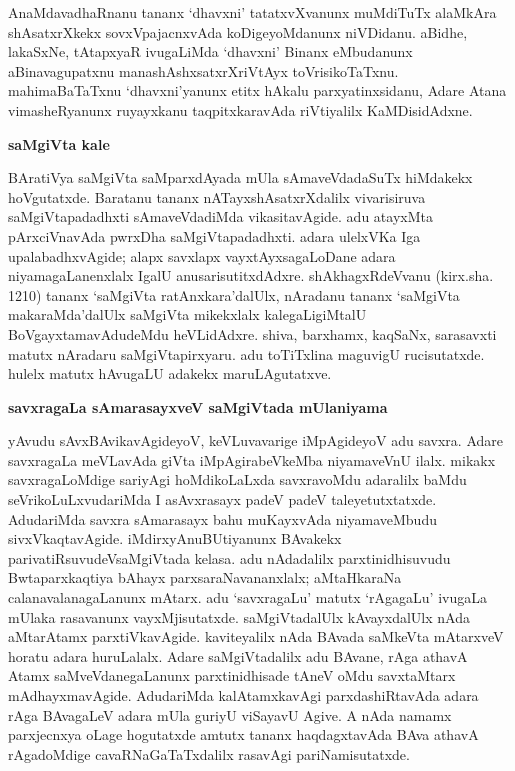 AnaMdavadhaRnanu tananx `dhavxni' tatatxvXvanunx muMdiTuTx alaMkAra shAsatxrXkekx sovxVpajacnx\-vAda koDigeyoMdanunx niVDidanu. aBidhe, lakaSxNe, tAtapxyaR ivugaLiMda `dhavxni' Binanx eMbudanunx aBinavagupatxnu manashAshxsatxrXriVtAyx toVrisikoTaTxnu. mahimaBaTaTxnu `dhavxni'yanunx etitx hAkalu parxyatinxsidanu, Adare Atana vimasheRyanunx ruyayxkanu taqpitxkaravAda riVtiyalilx KaMDisidAdxne.

\bigskip
\begin{center}
{\Large\bf saMgiVta kale}
\end{center}

BAratiVya saMgiVta saMparxdAyada mUla sAmaveVdadaSuTx hiMdakekx hoVgutatxde. Baratanu tananx nATayxshAsatxrXdalilx vivarisiruva saMgiVtapadadhxti sAmaveVdadiMda vikasita\break\-vAgide. adu atayxMta pArxciVnavAda pwrxDha saMgiVtapadadhxti. adara ulelxVKa Iga upa\-labadhxvAgide; alapx savxlapx vayxtAyxsagaLoDane adara niyamagaLanenxlalx IgalU anusarisu\-titxdAdxre. shAkhagxRdeVvanu (kirx.sha. 1210) tananx `saMgiVta ratAnxkara'dalUlx, nAradanu tananx `saMgiVta makaraMda'dalUlx saMgiVta mikekxlalx kalegaLigiMtalU BoVgayxtamavAdudeMdu heVLidAdxre. shiva, barxhamx, kaqSaNx, sarasavxti matutx nAradaru saMgiVtapirxyaru. adu toTiTxlina maguvigU rucisutatxde. hulelx matutx hAvugaLU adakekx maruLAgutatxve.

\bigskip
\begin{center}
{\Large\bf savxragaLa sAmarasayxveV saMgiVtada mUlaniyama}
\end{center}

yAvudu sAvxBAvikavAgideyoV, keVLuvavarige iMpAgideyoV adu savxra. Adare savxragaLa meVLavAda giVta iMpAgirabeVkeMba niyamaveVnU ilalx. mikakx savxragaLoMdige sariyAgi hoMdikoLaLxda savxravoMdu adaralilx baMdu seVrikoLuLxvudariMda I asAvx\-rasayx padeV padeV taleyetutxtatxde. AdudariMda savxra sAmarasayx bahu muKayxvAda niyama\break\-veMbudu sivxVkaqtavAgide. iMdirxyAnuBUtiyanunx BAvakekx parivatiRsuvudeV\break saMgiVtada kelasa. adu nAdadalilx parxtinidhisuvudu Bwtaparxkaqtiya bAhayx parxsaraNavananxlalx; aMtaHkaraNa calanavalanagaLanunx mAtarx. adu `savxragaLu' matutx `rAgagaLu' ivugaLa mUlaka rasavanunx vayxMjisutatxde. saMgiVtadalUlx kAvayxdalUlx nAda aMtarAtamx parxtiVka\-vAgide. kaviteyalilx nAda BAvada saMkeVta mAtarxveV horatu adara huruLalalx. Adare saMgiVtadalilx adu BAvane, rAga athavA Atamx saMveVdanegaLanunx parxtinidhisade tAneV oMdu savxtaMtarx mAdhayxmavAgide. AdudariMda kalAtamxkavAgi parxdashiRtavAda adara rAga BAvagaLeV adara mUla guriyU viSayavU Agive. A nAda namamx parxjecnxya oLage hogutatxde amtutx tananx haqdagxtavAda BAva athavA rAgadoMdige cavaRNaGaTaTxdalilx rasavAgi pariNamisutatxde.

